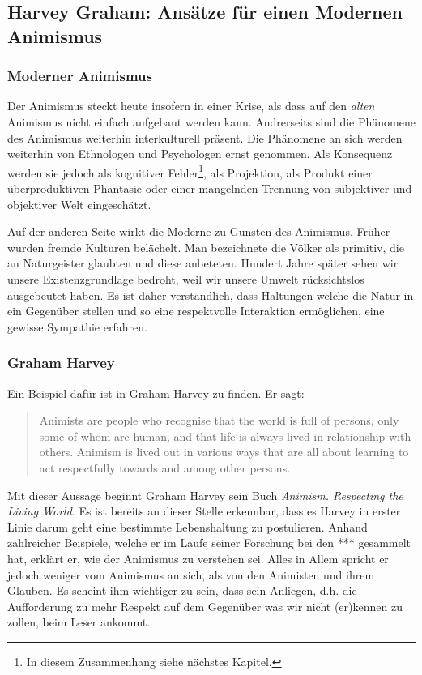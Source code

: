 \subsection{Harvey Graham: Ansätze für einen Modernen Animismus}
\subsubsection*{Moderner Animismus}
Der Animismus steckt heute insofern in einer Krise, als dass auf den \emph{alten} Animismus nicht einfach aufgebaut werden kann. Andrerseits sind die Phänomene des Animismus weiterhin interkulturell präsent. Die Phänomene an sich werden weiterhin von Ethnologen und Psychologen ernst genommen. Als Konsequenz werden sie jedoch als kognitiver Fehler\footnote{In diesem Zusammenhang siehe nächstes Kapitel.}, als Projektion, als Produkt einer überproduktiven Phantasie oder einer mangelnden Trennung von subjektiver und objektiver Welt eingeschätzt. 

Auf der anderen Seite wirkt die Moderne zu Gunsten des Animismus. Früher wurden fremde Kulturen belächelt. Man bezeichnete die Völker als primitiv, die an Naturgeister glaubten und diese anbeteten. Hundert Jahre später sehen wir unsere Existenzgrundlage bedroht, weil wir unsere Umwelt rücksichtslos ausgebeutet haben. Es ist daher verständlich, dass Haltungen welche die Natur in ein Gegenüber stellen und so eine respektvolle Interaktion ermöglichen, eine gewisse Sympathie erfahren. 

\subsubsection*{Graham Harvey}
Ein Beispiel dafür ist in Graham Harvey zu finden. Er sagt: 

\begin{quote}
	Animists are people who recognise that the world is full of persons, only some of whom are human, and that life is always lived in relationship with others. Animism is lived out in various ways that are all about learning to act respectfully towards and among other persons.
\end{quote}

Mit dieser Aussage beginnt Graham Harvey sein Buch \emph{Animism. Respecting the Living World}. Es ist bereits an dieser Stelle erkennbar, dass es Harvey in erster Linie darum geht eine bestimmte Lebenshaltung zu postulieren. Anhand zahlreicher Beispiele, welche er im Laufe seiner Forschung bei den *** gesammelt hat, erklärt er, wie der Animismus zu verstehen sei. Alles in Allem spricht er jedoch weniger vom Animismus an sich, als von den Animisten und ihrem Glauben. Es scheint ihm wichtiger zu sein, dass sein Anliegen, d.h. die Aufforderung zu mehr Respekt auf dem Gegenüber was wir nicht (er)kennen zu zollen, beim Leser ankommt. 

